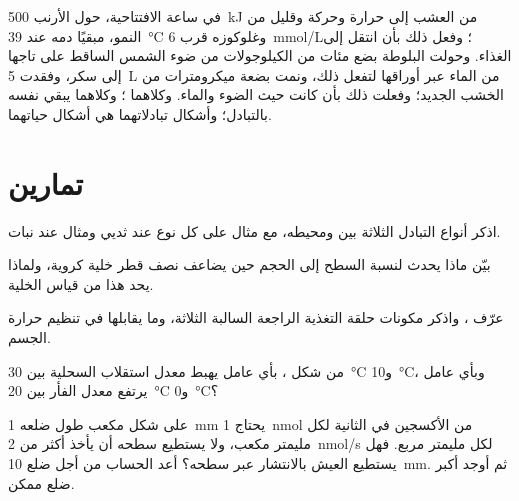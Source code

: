 \begin{example}\label{ex:b1:organism-environment:budgets}
في ساعة الافتتاحية، حول الأرنب \qty{500}{kJ} من العشب إلى حرارة
وحركة وقليل من النمو، مبقيًا دمه عند \qty{39}{\celsius} وغلوكوزه
قرب \qty{6}{mmol/L}؛ وفعل ذلك بأن انتقل إلى الغذاء. وحولت البلوطة
بضع مئات من الكيلوجولات من ضوء الشمس الساقط على تاجها إلى سكر،
وفقدت \qty{5}{L} من الماء عبر أوراقها لتفعل ذلك، ونمت بضعة
ميكرومترات من الخشب الجديد؛ وفعلت ذلك بأن كانت حيث الضوء والماء.
وكلاهما ؛ وكلاهما يبقي نفسه بالتبادل؛ وأشكال تبادلاتهما
هي أشكال حياتهما.
\end{example}

\section{تمارين}

\begin{exercise}[$\star$]\label{exo:b1:organism-environment:1}
اذكر أنواع التبادل الثلاثة بين  ومحيطه، مع مثال على كل نوع
عند ثديي ومثال عند نبات.
\end{exercise}

\begin{exercise}[$\star$]\label{exo:b1:organism-environment:2}
بيّن ماذا يحدث لنسبة السطح إلى الحجم حين يضاعف نصف قطر خلية كروية،
ولماذا يحد هذا من قياس الخلية.
\end{exercise}

\begin{exercise}[$\star$]\label{exo:b1:organism-environment:3}
عرّف ، واذكر مكونات حلقة التغذية الراجعة السالبة الثلاثة،
وما يقابلها في تنظيم حرارة الجسم.
\end{exercise}

\begin{exercise}[$\star$]\label{exo:b1:organism-environment:4}
من شكل ، بأي عامل يهبط معدل استقلاب السحلية بين
\qty{30}{\celsius} و\qty{10}{\celsius}، وبأي عامل يرتفع معدل الفأر
بين \qty{20}{\celsius} و\qty{0}{\celsius}؟
\end{exercise}

\begin{exercise}[$\star\star$]\label{exo:b1:organism-environment:5}
 على شكل مكعب طول ضلعه \qty{1}{mm} يحتاج \qty{1}{nmol} من
الأكسجين في الثانية لكل مليمتر مكعب، ولا يستطيع سطحه أن يأخذ أكثر
من \qty{2}{nmol/s} لكل مليمتر مربع. فهل يستطيع العيش بالانتشار عبر
سطحه؟ أعد الحساب من أجل ضلع \qty{10}{mm}. ثم أوجد أكبر ضلع ممكن.
\end{exercise}

